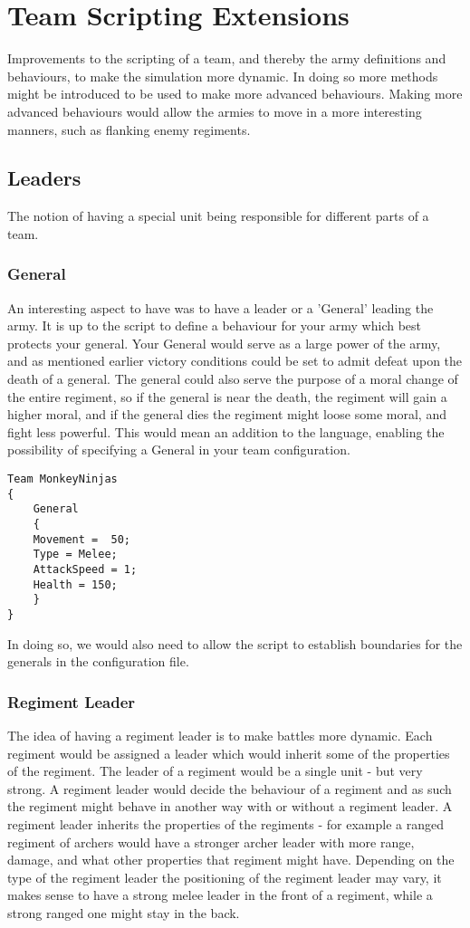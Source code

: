 \section{Team Scripting Extensions}
Improvements to the scripting of a team, and thereby the army definitions and behaviours, to make the simulation more dynamic. In doing so more methods might be introduced to be used to make more advanced behaviours. Making more advanced behaviours would allow the armies to move in a more interesting manners, such as flanking enemy regiments.
\subsection{Leaders}
The notion of having a special unit being responsible for different parts of a team.
\subsubsection*{General}
An interesting aspect to have was to have a leader or a 'General' leading the army. It is up to the script to define a behaviour for your army which best protects your general. Your General would serve as a large power of the army, and as mentioned earlier victory conditions could be set to admit defeat upon the death of a general.\label{moral} The general could also serve the purpose of a moral change of the entire regiment, so if the general is near the death, the regiment will gain a higher moral, and if the general dies the regiment might loose some moral, and fight less powerful. This would mean an addition to the language, enabling the possibility of specifying a General in your team configuration.
\begin{lstlisting}
Team MonkeyNinjas
{
	General
	{
	Movement =  50;
	Type = Melee;
	AttackSpeed = 1;
	Health = 150;
	}
}

\end{lstlisting}
In doing so, we would also need to allow the script to establish boundaries for the generals in the configuration file.
\subsubsection*{Regiment Leader}
The idea of having a regiment leader is to make battles more dynamic. Each regiment would be assigned a leader which would inherit some of the properties of the regiment.
The leader of a regiment would be a single unit - but very strong. A regiment leader would decide the behaviour of a regiment and as such the regiment might behave in another way with or without a regiment leader. A regiment leader inherits the properties of the regiments - for example a ranged regiment of archers would have a stronger archer leader with more range, damage, and what other properties that regiment might have. Depending on the type of the regiment leader the positioning of the regiment leader may vary, it makes sense to have a strong melee leader in the front of a regiment, while a strong ranged one might stay in the back.

